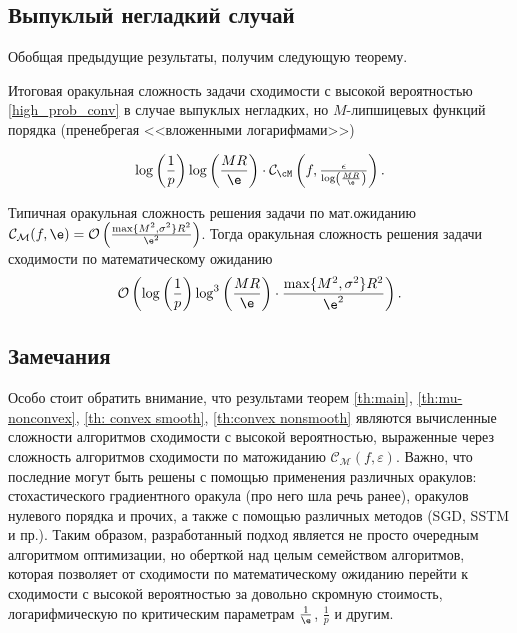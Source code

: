 \subsection{Выпуклый негладкий случай}

Обобщая предыдущие результаты, получим следующую теорему.

\begin{theorem}[Рубцов, 2025] \label{th:convex nonsmooth}
    Итоговая оракульная сложность задачи сходимости с высокой вероятностью \eqref{high_prob_conv} в случае выпуклых негладких, но $M$-липшицевых функций  порядка (пренебрегая <<вложенными логарифмами>>) 

    $$ \log\left(\frac{1}{p}\right)\log\left(\frac{MR}{\e}\right)\cdot \mathcal{C}_{\cM}\left(f,\tfrac{\epsilon}{\log\left(\frac{MR}{\e} \right)}\right).$$
\end{theorem}

Типичная оракульная сложность решения задачи по мат.ожиданию $\mathcal{C}_{\mathcal{M}}(f, \e) = \mathcal{O}\left(\frac{\max\{M^2, \sigma^2\}R^2}{ \e^2}\right)$. Тогда оракульная сложность решения задачи сходимости по математическому ожиданию 
\begin{equation}
    \mathcal{O}\left(\log\left(\frac{1}{p}\right)\log^3\left(\frac{MR}{\e}\right)\cdot \frac{\max\{M^2, \sigma^2\}R^2}{\e^2}\right).
\end{equation}

\subsection{Замечания}

Особо стоит обратить внимание, что результами теорем \ref{th:main}, \ref{th:mu-nonconvex}, \ref{th: convex smooth}, \ref{th:convex nonsmooth} являются вычисленные сложности алгоритмов сходимости с высокой вероятностью, выраженные через сложность алгоритмов сходимости по матожиданию $\mathcal{C}_{\mathcal{M}}(f, \varepsilon)$. Важно, что последние могут быть решены с помощью применения различных оракулов: стохастического градиентного оракула (про него шла речь ранее), оракулов нулевого порядка и прочих, а также с помощью различных методов (SGD, SSTM и пр.). Таким образом, разработанный подход является не просто очередным алгоритмом оптимизации, но оберткой над целым семейством алгоритмов, которая позволяет от сходимости по математическому ожиданию перейти к сходимости с высокой вероятностью за довольно скромную стоимость, логарифмическую по критическим параметрам $\frac{1}{\e}$, $\frac{1}{p}$ и другим.


